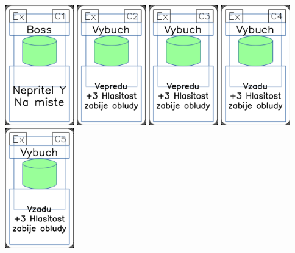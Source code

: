 \documentclass[a4paper]{article}
\begin{document}
	\includegraphics[width=3.0cm]{img-4_10}
	\includegraphics[width=3.0cm]{img-4_11}
	\includegraphics[width=3.0cm]{img-4_12}
	\includegraphics[width=3.0cm]{img-4_13}
	\includegraphics[width=3.0cm]{img-4_14}
\end{document}
